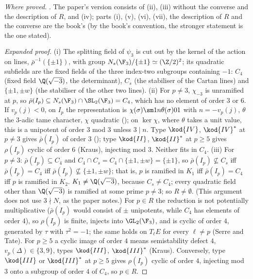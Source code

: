 \begin{sloppypar}
\noindent\emph{Where proved.} . The paper's version consists of (ii), (iii) without the converse and the description of $R$, and (iv); parts (i), (v), (vi), (vii),
the description of $R$ and the converse are the book's (by the book's convention, the stronger statement is the one stated).

\begin{proof}[Expanded proof]
(i) The splitting field of $\psi_3$ is cut out by the kernel of the action on lines, $\bar\rho^{-1}(\{\pm1\})$, with group $N_s(\F_3)/\{\pm1\}\simeq(\Z/2)^2$; its quadratic subfields are the fixed fields of
the three index-two subgroups containing $-1$: $C_4$ (fixed field $\Q(\sqrt{-3})$, the determinant), $C_s$ (the stabiliser of the Cartan lines) and $\{\pm1,\pm w\}$ (the stabiliser of the other
two lines). (ii) For $p\ne3$, $\chi_{-3}$ is unramified at $p$, so $\bar\rho(I_p)\subseteq N_s(\F_3)\cap\SL_2(\F_3)=C_4$, which has no element of order $3$ or $6$. If $v_p(j)<0$, on $I_p$ the representation
is $\chi(\sigma)\sm1{n\theta(\sigma)}01$ with $n=-v_p(j)$, $\theta$ the $3$-adic tame character, $\chi$ quadratic (); on $\ker\chi$, where $\theta$ takes a unit value, this is a
unipotent of order $3$ mod $3$ unless $3\mid n$. Type $\kod{IV}$, $\kod{IV}^*$ at $p\ne3$ gives $\bar\rho(I_p)$ of order $3$ (); type $\kod{II}$, $\kod{II}^*$ at $p\ge5$ gives $\rho(I_p)$ cyclic of
order $6$ (Kraus), injecting mod $3$. Neither fits in $C_4$. (iii) For $p\ne3$: $\bar\rho(I_p)\subseteq C_4$ and $C_4\cap C_s=C_4\cap\{\pm1,\pm w\}=\{\pm1\}$, so $\bar\rho(I_p)\not\subseteq C_s$ iff $\bar\rho(I_p)=C_4$ iff
$\bar\rho(I_p)\not\subseteq\{\pm1,\pm w\}$; that is, $p$ is ramified in $K_1$ iff $\bar\rho(I_p)=C_4$ iff $p$ is ramified in $K_2$. $K_1\ne\Q(\sqrt{-3})$, because $C_s\ne C_4$; every quadratic field other than
$\Q(\sqrt{-3})$ is ramified at some prime $p\ne3$; so $R\ne\emptyset$. (This argument does not use $3\nmid N$, as the paper notes.) For $p\in R$ the reduction is not potentially multiplicative
($\bar\rho(I_p)$ would consist of $\pm$ unipotents, while $C_4$ has elements of order $4$), so $\rho(I_p)$ is finite, injects into $\GL_2(\F_3)$, and is cyclic of order $4$, generated by $\tau$ with
$\tau^2=-1$; the same holds on $T_\ell E$ for every $\ell\ne p$ (Serre and Tate). For $p\ge5$ a cyclic image of order $4$ means semistability defect $4$, $v_p(\Delta)\in\{3,9\}$, types $\kod{III}$,
$\kod{III}^*$ (Kraus). Conversely, type $\kod{III}$ or $\kod{III}^*$ at $p\ge5$ gives $\rho(I_p)$ cyclic of order $4$, injecting mod $3$ onto a subgroup of order $4$ of $C_4$, so $p\in R$.

\end{proof}
\end{sloppypar}
